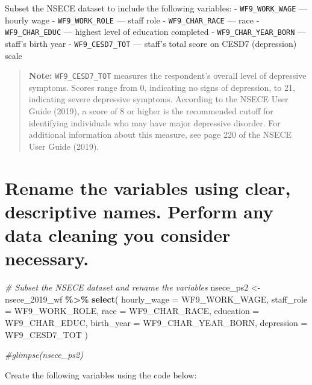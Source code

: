 \documentclass[
]{article}
\newenvironment{Shaded}{\begin{snugshade}}{\end{snugshade}}
\newcommand{\AttributeTok}[1]{\textcolor[rgb]{0.13,0.29,0.53}{#1}}
\newcommand{\CommentTok}[1]{\textcolor[rgb]{0.56,0.35,0.01}{\textit{#1}}}
\newcommand{\FunctionTok}[1]{\textcolor[rgb]{0.13,0.29,0.53}{\textbf{#1}}}
\newcommand{\NormalTok}[1]{#1}
\newcommand{\OtherTok}[1]{\textcolor[rgb]{0.56,0.35,0.01}{#1}}
\newcommand{\SpecialCharTok}[1]{\textcolor[rgb]{0.81,0.36,0.00}{\textbf{#1}}}
\begin{document}
Subset the NSECE dataset to include the following variables: -
\texttt{WF9\_WORK\_WAGE} --- hourly wage - \texttt{WF9\_WORK\_ROLE} ---
staff role - \texttt{WF9\_CHAR\_RACE} --- race -
\texttt{WF9\_CHAR\_EDUC} --- highest level of education completed -
\texttt{WF9\_CHAR\_YEAR\_BORN} --- staff's birth year -
\texttt{WF9\_CESD7\_TOT} --- staff's total score on CESD7 (depression)
scale

\begin{quote}
\textbf{Note:} \texttt{WF9\_CESD7\_TOT} measures the respondent's
overall level of depressive symptoms. Scores range from 0, indicating no
signs of depression, to 21, indicating severe depressive symptoms.
According to the NSECE User Guide (2019), a score of 8 or higher is the
recommended cutoff for identifying individuals who may have major
depressive disorder. For additional information about this measure, see
page 220 of the NSECE User Guide (2019).
\end{quote}

\section{Rename the variables using clear, descriptive names. Perform
any data cleaning you consider
necessary.}\label{rename-the-variables-using-clear-descriptive-names.-perform-any-data-cleaning-you-consider-necessary.}

\begin{Shaded}
\begin{Highlighting}[]
\CommentTok{\# Subset the NSECE dataset and rename the variables}
\NormalTok{nsece\_ps2 }\OtherTok{\textless{}{-}} 
\NormalTok{  nsece\_2019\_wf }\SpecialCharTok{\%\textgreater{}\%}
  \FunctionTok{select}\NormalTok{(}
    \AttributeTok{hourly\_wage =}\NormalTok{ WF9\_WORK\_WAGE,}
    \AttributeTok{staff\_role =}\NormalTok{ WF9\_WORK\_ROLE,}
    \AttributeTok{race =}\NormalTok{ WF9\_CHAR\_RACE,}
    \AttributeTok{education =}\NormalTok{ WF9\_CHAR\_EDUC,}
    \AttributeTok{birth\_year =}\NormalTok{ WF9\_CHAR\_YEAR\_BORN,}
    \AttributeTok{depression =}\NormalTok{ WF9\_CESD7\_TOT}
\NormalTok{  )}

\CommentTok{\#glimpse(nsece\_ps2)}
\end{Highlighting}
\end{Shaded}

Create the following variables using the code below:
\end{document}
